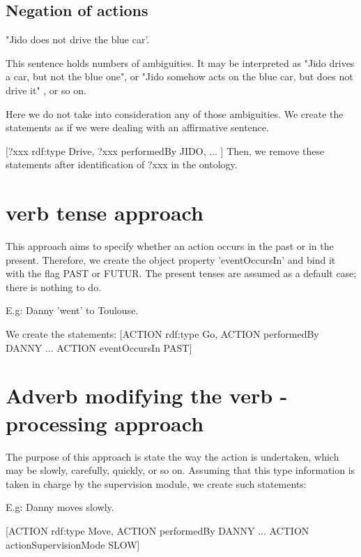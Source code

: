 \documentclass[twoside,a4paper,10pt]{report}
\newcommand{\dokutitleleveltree}[1]{\section{#1}}
\newcommand{\dokutitlelevelfour}[1]{\subsection{#1}}
\begin{document}
\dokutitlelevelfour{Negation of actions}

\small
\begin{verbatimtab}
  
  "Jido does not drive the blue car'.
  
  This sentence holds numbers of ambiguities. It may be interpreted as "Jido drives  a car, but not
the blue one", or 
  "Jido somehow acts on the blue car, but does not drive it" , or so on.
  
  Here we do not take into consideration any of those ambiguities. We create the statements as if we
were dealing with an
  affirmative sentence.
  
  [?xxx rdf:type Drive,
  ?xxx performedBy JIDO,
  ...
  ]
  Then, we remove these statements after identification of ?xxx in the ontology.
  
\end{verbatimtab}
\normalsize

\dokutitleleveltree{verb tense approach}
\label{08641b0199dbb907cbef92fe4bff9f19}%
This approach aims to specify whether an action occurs in the past or in the present. Therefore, we create the object property 'eventOccursIn' and bind it with the flag PAST or FUTUR. The present tenses are assumed as a default case; there is nothing to do.


\small
\begin{verbatimtab}
  
  E.g: Danny 'went' to Toulouse.
  
  We create the statements:
  [ACTION rdf:type Go,
  ACTION performedBy DANNY
  ...
  ACTION eventOccursIn PAST]
  
  
\end{verbatimtab}
\normalsize

\dokutitleleveltree{Adverb modifying the verb - processing approach}
\label{6b19ff9faa8e1c3a849daa76f49f7353}%

The purpose of this approach is state the way the action is undertaken, which may be slowly, carefully, quickly, or so on.
Assuming that this type information is taken in charge by the supervision module, we create such statements:


\small
\begin{verbatimtab}
  
  E.g: Danny moves slowly.
  
  [ACTION rdf:type Move,
  ACTION performedBy DANNY
  ...
  ACTION actionSupervisionMode SLOW]
  
\end{verbatimtab}
\normalsize
\end{document}
